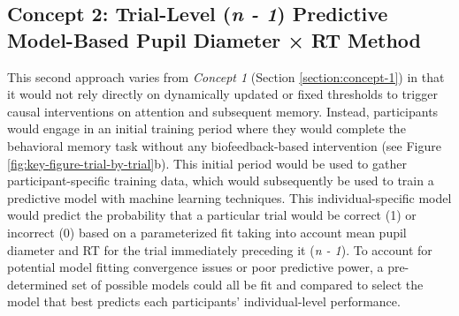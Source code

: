 \subsection{Concept 2: Trial-Level (\emph{n - 1}) Predictive Model-Based Pupil Diameter × RT Method}
\label{section:concept-2}
This second approach varies from \emph{Concept 1} (Section \ref{section:concept-1}) in that it would not rely directly on dynamically updated or fixed thresholds to trigger causal interventions on attention and subsequent memory. Instead, participants would engage in an initial training period where they would complete the behavioral memory task without any biofeedback-based intervention (see Figure \ref{fig:key-figure-trial-by-trial}b). This initial period would be used to gather participant-specific training data, which would subsequently be used to train a predictive model with machine learning techniques. This individual-specific model would predict the probability that a particular trial would be correct (1) or incorrect (0) based on a parameterized fit taking into account mean pupil diameter and RT for the trial immediately preceding it (\emph{n - 1}). To account for potential model fitting convergence issues or poor predictive power, a pre-determined set of possible models could all be fit and compared to select the model that best predicts each participants' individual-level performance. 

